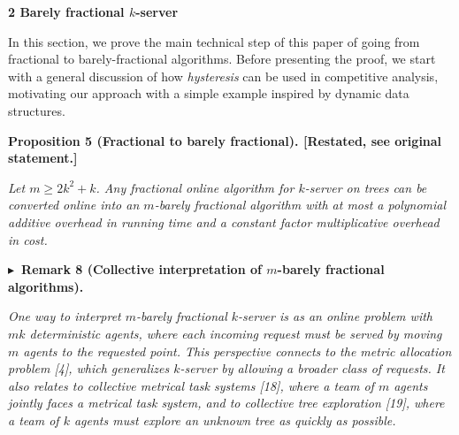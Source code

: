 \documentclass[10pt,a4paper]{article}
\begin{document}
\par\medskip\noindent\textbf{
2 Barely fractional $k$-server}\par




In this section, we prove the main technical step of this paper of going from fractional to barely-fractional algorithms. Before presenting the proof, we start with a general discussion of how \emph{hysteresis} can be used in competitive analysis, motivating our approach with a simple example inspired by dynamic data structures.\par






\par\medskip\noindent\textbf{
\textbf{Proposition 5}\textbf{ }(Fractional to barely fractional)\textbf{.}
[Restated, see original statement.]}\par



\emph{Let $m\geq 2k^{2}+k$. Any fractional online algorithm for $k$-server on trees can be converted online into an $m$-barely fractional algorithm with at most a polynomial additive overhead in running time and a constant factor multiplicative overhead in cost.}\par








\par\medskip\noindent\textbf{
$\blacktriangleright$ Remark 8 (Collective interpretation of $m$-barely fractional algorithms).
}\par



\emph{One way to interpret $m$-barely fractional $k$-server is as an online problem with $mk$ deterministic agents, where each incoming request must be served by moving $m$ agents to the requested point.
This perspective connects to the metric allocation problem [4], which generalizes $k$-server by allowing a broader class of requests. It also relates to collective metrical task systems [18], where a team of $m$ agents jointly faces a metrical task system, and to collective tree exploration [19], where a team of $k$ agents must explore an unknown tree as quickly as possible.}\par
\end{document}
